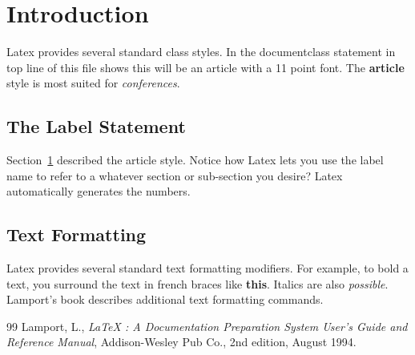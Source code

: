 ﻿\documentclass[11pt]{article}
\begin{document}
         
\section{Introduction}
\label{Introduction}

Latex provides several standard class styles.  In the
documentclass statement in top line of this file shows this
will be an article with a 11 point font.  The {\bf article} 
style is most suited for {\it conferences}.

\subsection{The Label Statement}
\label{labelStatement}

Section~\ref{Introduction} described the article style.  Notice
how Latex lets you use the label name to refer to a whatever
section or sub-section you desire?  Latex automatically generates
the numbers.

\subsection{Text Formatting}
\label{textFormatting}

Latex provides several standard text formatting modifiers.
For example, to bold a text, you surround the text in french
braces like {\bf this}.  Italics are also {\it possible}.
Lamport's book \cite{lamport} describes additional text formatting
commands.

\begin{thebibliography}{99}
 Lamport, L., {\it LaTeX : A Documentation
 Preparation System User's Guide and Reference Manual}, Addison-Wesley 
 Pub Co., 2nd edition, August 1994.
\end{thebibliography}
 
\end{document}
